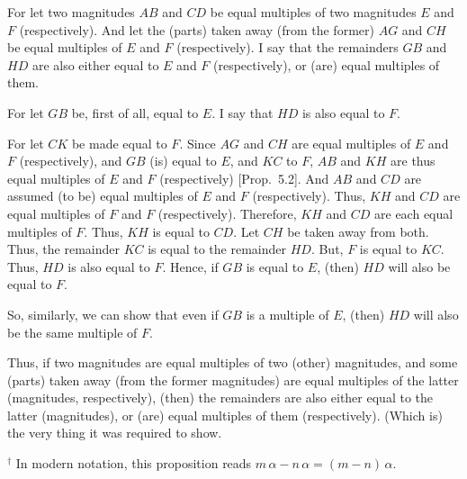 \begin{Parallel}{}{}
{For let two magnitudes $AB$ and $CD$ be equal multiples of two magnitudes
$E$ and $F$ (respectively). And let the (parts)  taken away (from the former) $AG$ and $CH$ be equal multiples of $E$ and $F$ (respectively). I say that the remainders $GB$ and
$HD$ are also either equal to $E$ and $F$ (respectively), or (are) equal multiples of them.

\epsfysize=1.8in
\centerline{}

For let $GB$ be, first of all, equal to $E$. I say that $HD$ is also equal to $F$.

For let  $CK$ be made equal to $F$. Since $AG$ and $CH$ are equal multiples of $E$ and $F$ (respectively), and $GB$ (is) equal to $E$, and $KC$ to $F$,
$AB$ and $KH$ are thus equal multiples of $E$ and $F$ (respectively)
[Prop.~5.2].
And $AB$ and $CD$ are assumed (to be) equal multiples of $E$ and $F$ (respectively). Thus, $KH$ and $CD$ are equal multiples of $F$ and $F$ (respectively). Therefore, $KH$ and $CD$ are each equal multiples of $F$. Thus, $KH$
is equal to $CD$. Let $CH$  be taken away from both. Thus, the remainder
$KC$ is equal to the remainder $HD$. But, $F$ is equal to $KC$. Thus, $HD$ is also equal to $F$. Hence, if $GB$ is equal to $E$, (then) $HD$ will also be equal to $F$.

So, similarly, we can show that even if $GB$ is a multiple of $E$, (then) $HD$
will also be the same multiple of $F$.

Thus, if two magnitudes are equal multiples of two (other) magnitudes, and some (parts) taken away (from the former magnitudes) are equal multiples of the latter (magnitudes, respectively),
(then) the remainders  are also either equal to the latter (magnitudes), or (are) equal multiples of them (respectively). (Which is) the very thing it was required to show.}
\end{Parallel}
{\footnotesize \noindent$^\dag$ In modern notation, this
proposition reads $m\,\alpha-n\,\alpha = (m-n)\,\alpha$.}

